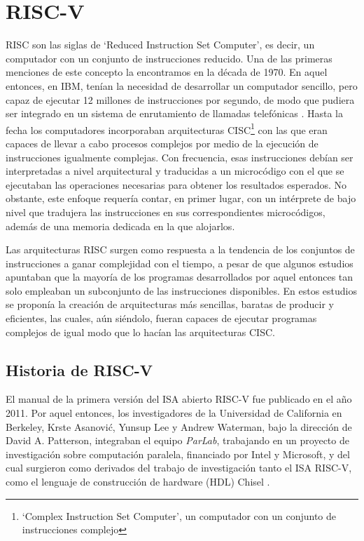 \chapter{RISC-V}

RISC son las siglas de `Reduced Instruction Set Computer', es decir, un computador con un conjunto de instrucciones reducido. Una de las primeras menciones de este concepto la encontramos en la década de 1970. En aquel entonces, en IBM, tenían la necesidad de desarrollar un computador sencillo, pero capaz de ejecutar 12 millones de instrucciones por segundo, de modo que pudiera ser integrado en un sistema de enrutamiento de llamadas telefónicas \cite{cocke1990evolution}.
Hasta la fecha los computadores incorporaban arquitecturas CISC\footnote{`Complex Instruction Set Computer', un computador con un conjunto de instrucciones complejo} con las que eran capaces de llevar a cabo procesos complejos por medio de la ejecución de instrucciones igualmente complejas. Con frecuencia, esas instrucciones debían ser interpretadas a nivel arquitectural y traducidas a un microcódigo con el que se ejecutaban las operaciones necesarias para obtener los resultados esperados. No obstante, este enfoque requería  contar, en primer lugar, con un intérprete de bajo nivel que tradujera las instrucciones en sus correspondientes microcódigos, además de una memoria dedicada en la que alojarlos.

Las arquitecturas RISC surgen como respuesta a la tendencia de los conjuntos de instrucciones a ganar complejidad con el tiempo, a pesar de que algunos estudios \cite{tanenbaum1978implications} apuntaban que la mayoría de los programas desarrollados por aquel entonces tan solo empleaban un subconjunto de las instrucciones disponibles. En estos estudios se proponía la creación de arquitecturas más sencillas, baratas de producir y eficientes, las cuales, aún siéndolo, fueran capaces de ejecutar programas complejos de igual modo que lo hacían las arquitecturas CISC.

\section{Historia de RISC-V}

El manual de la primera versión del ISA abierto RISC-V fue publicado en el año 2011. Por aquel entonces, los investigadores de la Universidad de California en Berkeley, Krste Asanović, Yunsup Lee y Andrew Waterman, bajo la dirección de David A. Patterson, integraban el equipo \textit{ParLab}, trabajando en un proyecto de investigación sobre computación paralela, financiado por Intel y Microsoft, y del cual surgieron como derivados del trabajo de investigación tanto el ISA RISC-V, como el lenguaje de construcción de hardware (HDL) Chisel \cite{riscvhistory}.

